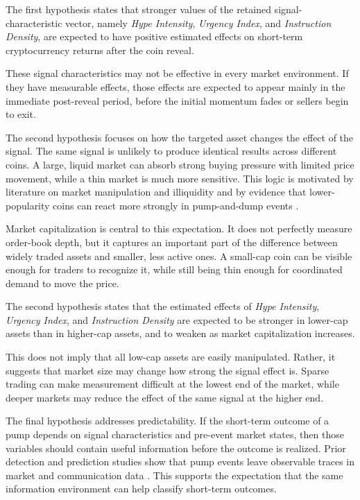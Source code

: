 The first hypothesis states that stronger values of the retained signal-characteristic vector, namely \textit{Hype Intensity}, \textit{Urgency Index}, and \textit{Instruction Density}, are expected to have positive estimated effects on short-term cryptocurrency returns after the coin reveal.

These signal characteristics may not be effective in every market environment. If they have measurable effects, those effects are expected to appear mainly in the immediate post-reveal period, before the initial momentum fades or sellers begin to exit.

The second hypothesis focuses on how the targeted asset changes the effect of the signal. The same signal is unlikely to produce identical results across different coins. A large, liquid market can absorb strong buying pressure with limited price movement, while a thin market is much more sensitive. This logic is motivated by literature on market manipulation and illiquidity \cite{amihud2002illiquidity, dhawan2023new} and by evidence that lower-popularity coins can react more strongly in pump-and-dump events \cite{hamrick2021examination}.

Market capitalization is central to this expectation. It does not perfectly measure order-book depth, but it captures an important part of the difference between widely traded assets and smaller, less active ones. A small-cap coin can be visible enough for traders to recognize it, while still being thin enough for coordinated demand to move the price.

The second hypothesis states that the estimated effects of \textit{Hype Intensity}, \textit{Urgency Index}, and \textit{Instruction Density} are expected to be stronger in lower-cap assets than in higher-cap assets, and to weaken as market capitalization increases.

This does not imply that all low-cap assets are easily manipulated. Rather, it suggests that market size may change how strong the signal effect is. Sparse trading can make measurement difficult at the lowest end of the market, while deeper markets may reduce the effect of the same signal at the higher end.

The final hypothesis addresses predictability. If the short-term outcome of a pump depends on signal characteristics and pre-event market states, then those variables should contain useful information before the outcome is realized. Prior detection and prediction studies show that pump events leave observable traces in market and communication data \cite{kamps2018pump, lamorgia2020pump, hu2023sequence}. This supports the expectation that the same information environment can help classify short-term outcomes.

